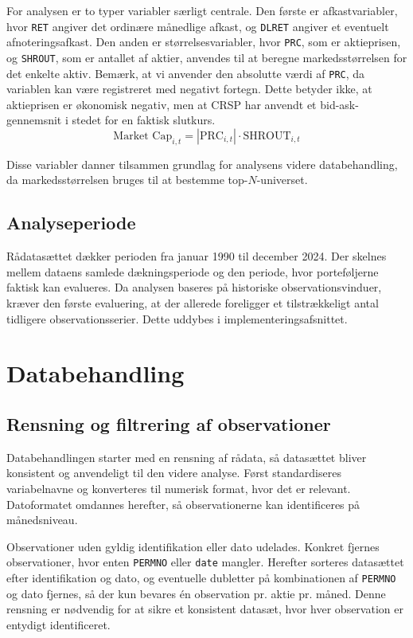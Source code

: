 \documentclass[../main.tex]{subfiles}
\begin{document}
For analysen er to typer variabler særligt centrale. Den første er afkastvariabler, hvor \texttt{RET} angiver det ordinære månedlige afkast, og \texttt{DLRET} angiver et eventuelt afnoteringsafkast. Den anden er størrelsesvariabler, hvor \texttt{PRC}, som er aktieprisen, og \texttt{SHROUT}, som er antallet af aktier, anvendes til at beregne markedsstørrelsen for det enkelte aktiv. Bemærk, at vi anvender den absolutte værdi af \texttt{PRC}, da variablen kan være registreret med negativt fortegn. Dette betyder ikke, at aktieprisen er økonomisk negativ, men at CRSP har anvendt et bid-ask-gennemsnit i stedet for en faktisk slutkurs.
\begin{equation}
    \label{eq:market_cap}
    \text{Market Cap}_{i,t} = \left| \text{PRC}_{i,t} \right| \cdot \text{SHROUT}_{i,t}
\end{equation}

Disse variabler danner tilsammen grundlag for analysens videre databehandling, da markedsstørrelsen bruges til at bestemme top-$N$-universet.

\subsection{Analyseperiode}

Rådatasættet dækker perioden fra januar 1990 til december 2024. Der skelnes mellem dataens samlede dækningsperiode og den periode, hvor porteføljerne faktisk kan evalueres. Da analysen baseres på historiske observationsvinduer, kræver den første evaluering, at der allerede foreligger et tilstrækkeligt antal tidligere observationsserier. Dette uddybes i implementeringsafsnittet.


\section{Databehandling}

\subsection{Rensning og filtrering af observationer}

Databehandlingen starter med en rensning af rådata, så datasættet bliver konsistent og anvendeligt til den videre analyse. Først standardiseres variabelnavne og konverteres til numerisk format, hvor det er relevant. Datoformatet omdannes herefter, så observationerne kan identificeres på månedsniveau.

Observationer uden gyldig identifikation eller dato udelades. Konkret fjernes observationer, hvor enten \texttt{PERMNO} eller \texttt{date} mangler. Herefter sorteres datasættet efter identifikation og dato, og eventuelle dubletter på kombinationen af \texttt{PERMNO} og dato fjernes, så der kun bevares én observation pr. aktie pr. måned. Denne rensning er nødvendig for at sikre et konsistent datasæt, hvor hver observation er entydigt identificeret.
\end{document}
